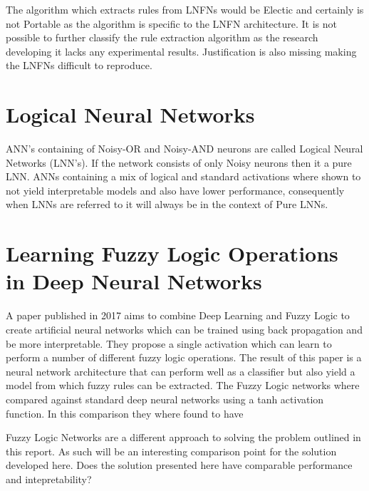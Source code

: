 The algorithm which extracts rules from LNFNs would be Electic and certainly is not Portable as the algorithm is specific to the LNFN architecture. It is not possible to further classify the rule extraction algorithm as the research developing it lacks any experimental results. Justification is also missing making the LNFNs difficult to reproduce.

\section{Logical Neural Networks}
ANN's containing of Noisy-OR and Noisy-AND neurons are called Logical Neural Networks \cite{LearningLogicalActivations} (LNN's). If the network consists of only Noisy neurons then it a pure LNN. ANNs containing a mix of logical and standard activations where shown to not yield interpretable models and also have lower performance, consequently when LNNs are referred to it will always be in the context of Pure LNNs.


\section{Learning Fuzzy Logic Operations in Deep Neural Networks}
A paper published in 2017 \cite{godfrey2017parameterized} aims to combine Deep Learning and Fuzzy Logic to create artificial neural networks which can be trained using back propagation and be more interpretable.  They propose a single activation which can learn to perform a number of different fuzzy logic operations. The result of this paper is a neural network architecture that can perform well as a classifier but also yield a model from which fuzzy rules can be extracted. The Fuzzy Logic networks where compared against standard deep neural networks using a tanh activation function. In this comparison they where found to have 

Fuzzy Logic Networks are a different approach to solving the problem outlined in this report. As such will be an interesting comparison point for the solution developed here. Does the solution presented here have comparable performance and intepretability? 


